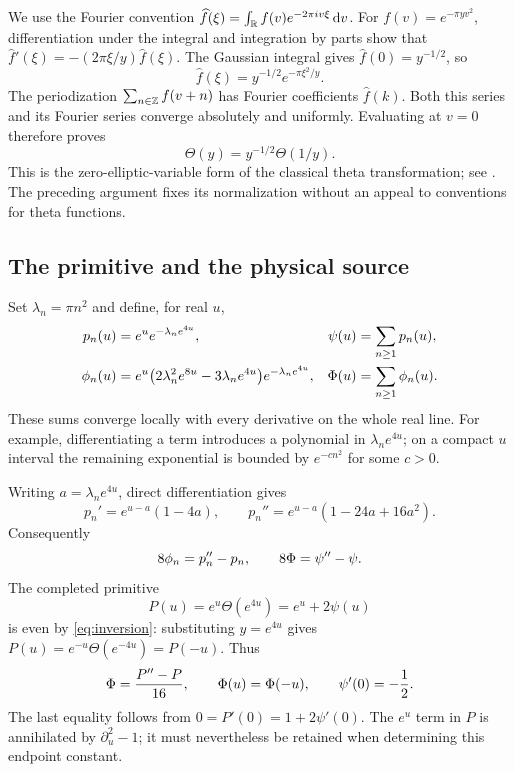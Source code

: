 We use the Fourier convention
$\widehat f(\xi)=\int_\mathbb R f(v)e^{-2\pi i v\xi}\,\mathrm d v$.
For $f(v)=e^{-\pi yv^2}$, differentiation under the integral and integration
by parts show that
$\widehat f'(\xi)=-(2\pi\xi/y)\widehat f(\xi)$.
The Gaussian integral gives $\widehat f(0)=y^{-1/2}$, so
\[
 \widehat f(\xi)=y^{-1/2}e^{-\pi\xi^2/y}.
\]
The periodization $\sum_{n\in\mathbb Z}f(v+n)$ has Fourier coefficients
$\widehat f(k)$. Both this series and its Fourier series converge
absolutely and uniformly. Evaluating at $v=0$ therefore proves
\begin{equation}\label{eq:inversion}
 \Theta(y)=y^{-1/2}\Theta(1/y).
\end{equation}
This is the zero-elliptic-variable form of the classical theta
transformation; see \cite{DLMF}. The preceding argument fixes its
normalization without an appeal to conventions for theta functions.

\subsection{The primitive and the physical source}

Set $\lambda_n=\pi n^2$ and define, for real $u$,
\begin{align}
 p_n(u)&=e^u e^{-\lambda_n e^{4u}},&
 \psi(u)&=\sum_{n\ge1}p_n(u),\label{eq:primitive}\\
 \phi_n(u)&=e^u\bigl(2\lambda_n^2e^{8u}-3\lambda_ne^{4u}\bigr)
                 e^{-\lambda_ne^{4u}},&
 \Phi(u)&=\sum_{n\ge1}\phi_n(u).\label{eq:source}
\end{align}
These sums converge locally with every derivative on the whole real line.
For example, differentiating a term introduces a polynomial in
$\lambda_ne^{4u}$; on a compact $u$ interval the remaining exponential is
bounded by $e^{-c n^2}$ for some $c>0$.

Writing $a=\lambda_ne^{4u}$, direct differentiation gives
\[
 p_n'=e^{u-a}(1-4a),\qquad
 p_n''=e^{u-a}(1-24a+16a^2).
\]
Consequently
\begin{equation}\label{eq:source-operator}
 8\phi_n=p_n''-p_n,\qquad
 8\Phi=\psi''-\psi.
\end{equation}
The completed primitive
\begin{equation}\label{eq:P}
 P(u)=e^u\Theta(e^{4u})=e^u+2\psi(u)
\end{equation}
is even by \eqref{eq:inversion}: substituting $y=e^{4u}$ gives
$P(u)=e^{-u}\Theta(e^{-4u})=P(-u)$. Thus
\begin{equation}\label{eq:reflection}
 \Phi=\frac{P''-P}{16},\qquad
 \Phi(u)=\Phi(-u),\qquad \psi'(0)=-\frac12.
\end{equation}
The last equality follows from $0=P'(0)=1+2\psi'(0)$.
The $e^u$ term in $P$ is annihilated by $\partial_u^2-1$; it must nevertheless
be retained when determining this endpoint constant.

